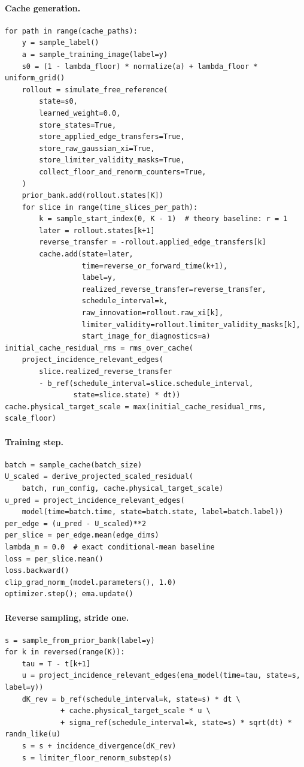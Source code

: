 \documentclass[11pt]{article}
\numberwithin{equation}{section}
\newcommand{\1}{\mathbf 1}
\begin{document}
\paragraph{Cache generation.}
\begin{verbatim}
for path in range(cache_paths):
    y = sample_label()
    a = sample_training_image(label=y)
    s0 = (1 - lambda_floor) * normalize(a) + lambda_floor * uniform_grid()
    rollout = simulate_free_reference(
        state=s0,
        learned_weight=0.0,
        store_states=True,
        store_applied_edge_transfers=True,
        store_raw_gaussian_xi=True,
        store_limiter_validity_masks=True,
        collect_floor_and_renorm_counters=True,
    )
    prior_bank.add(rollout.states[K])
    for slice in range(time_slices_per_path):
        k = sample_start_index(0, K - 1)  # theory baseline: r = 1
        later = rollout.states[k+1]
        reverse_transfer = -rollout.applied_edge_transfers[k]
        cache.add(state=later,
                  time=reverse_or_forward_time(k+1),
                  label=y,
                  realized_reverse_transfer=reverse_transfer,
                  schedule_interval=k,
                  raw_innovation=rollout.raw_xi[k],
                  limiter_validity=rollout.limiter_validity_masks[k],
                  start_image_for_diagnostics=a)
initial_cache_residual_rms = rms_over_cache(
    project_incidence_relevant_edges(
        slice.realized_reverse_transfer
        - b_ref(schedule_interval=slice.schedule_interval,
                state=slice.state) * dt))
cache.physical_target_scale = max(initial_cache_residual_rms, scale_floor)
\end{verbatim}

\paragraph{Training step.}
\begin{verbatim}
batch = sample_cache(batch_size)
U_scaled = derive_projected_scaled_residual(
    batch, run_config, cache.physical_target_scale)
u_pred = project_incidence_relevant_edges(
    model(time=batch.time, state=batch.state, label=batch.label))
per_edge = (u_pred - U_scaled)**2
per_slice = per_edge.mean(edge_dims)
lambda_m = 0.0  # exact conditional-mean baseline
loss = per_slice.mean()
loss.backward()
clip_grad_norm_(model.parameters(), 1.0)
optimizer.step(); ema.update()
\end{verbatim}

\paragraph{Reverse sampling, stride one.}
\begin{verbatim}
s = sample_from_prior_bank(label=y)
for k in reversed(range(K)):
    tau = T - t[k+1]
    u = project_incidence_relevant_edges(ema_model(time=tau, state=s, label=y))
    dK_rev = b_ref(schedule_interval=k, state=s) * dt \
             + cache.physical_target_scale * u \
             + sigma_ref(schedule_interval=k, state=s) * sqrt(dt) * randn_like(u)
    s = s + incidence_divergence(dK_rev)
    s = limiter_floor_renorm_substep(s)
\end{verbatim}
\end{document}
